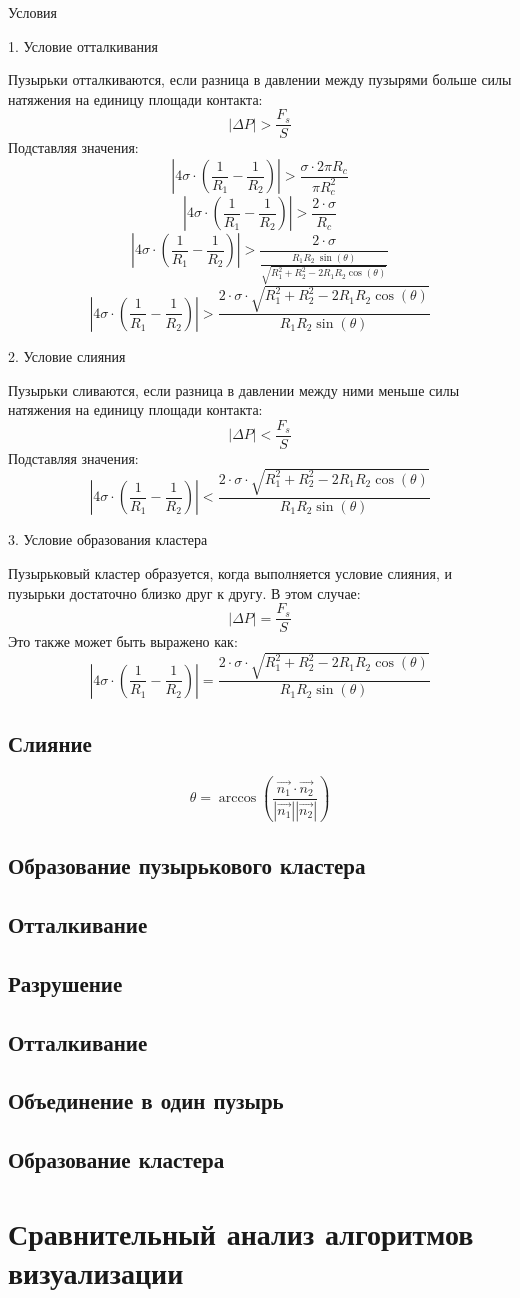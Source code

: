 Условия

1. Условие отталкивания

Пузырьки отталкиваются, если разница в давлении между пузырями больше силы натяжения на единицу площади контакта: \[ |\Delta P| > \frac{F_s}{S} \]
Подставляя значения:
\[ \left| 4 \sigma \cdot (\frac{1}{R_{1}}-\frac{1}{R_{2}}) \right| > \frac{\sigma \cdot 2\pi R_{c}}{\pi R_{c}^2}\]
\[ \left| 4 \sigma \cdot (\frac{1}{R_{1}}-\frac{1}{R_{2}}) \right| > \frac{2 \cdot \sigma}{R_{c}}\]
\[ \left| 4 \sigma \cdot (\frac{1}{R_{1}}-\frac{1}{R_{2}}) \right| > \frac{2 \cdot \sigma}{\frac{R_{1}R_{2}\ \sin(\theta)}{\sqrt{R_{1}^2 + R_{2}^2 - 2R_{1}R_{2} \cos(\theta)}}}\]
\[ \left| 4 \sigma \cdot (\frac{1}{R_{1}}-\frac{1}{R_{2}}) \right| > \frac{2 \cdot \sigma \cdot \sqrt{R_{1}^2 + R_{2}^2 - 2R_{1}R_{2} \cos(\theta)}}{R_{1}R_{2} \sin(\theta)}\]

2. Условие слияния

Пузырьки сливаются, если разница в давлении между ними меньше силы натяжения на единицу площади контакта: \[ |\Delta P| < \frac{F_s}{S} \]
Подставляя значения: \[ \left| 4 \sigma \cdot (\frac{1}{R_{1}}-\frac{1}{R_{2}}) \right| < \frac{2 \cdot \sigma \cdot \sqrt{R_{1}^2 + R_{2}^2 - 2R_{1}R_{2} \cos(\theta)}}{R_{1}R_{2} \sin(\theta)}\]


3. Условие образования кластера


Пузырьковый кластер образуется, когда выполняется условие слияния, и пузырьки достаточно близко друг к другу. В этом случае: \[ |\Delta P| = \frac{F_s}{S} \]
Это также может быть выражено как: \[ \left| 4 \sigma \cdot (\frac{1}{R_{1}}-\frac{1}{R_{2}}) \right| = \frac{2 \cdot \sigma \cdot \sqrt{R_{1}^2 + R_{2}^2 - 2R_{1}R_{2} \cos(\theta)}}{R_{1}R_{2} \sin(\theta)}\]


\subsection{Слияние}
\[ \theta = \arccos \left( \frac{\vec{n_1} \cdot \vec{n_2}}{|\vec{n_1}| |\vec{n_2}|} \right) 
\]


\subsection{Образование пузырькового кластера}
\subsection{Отталкивание}
\subsection{Разрушение}

\subsection{Отталкивание}
\subsection{Объединение в один пузырь}
\subsection{Образование кластера}
\section{Сравнительный анализ алгоритмов визуализации}